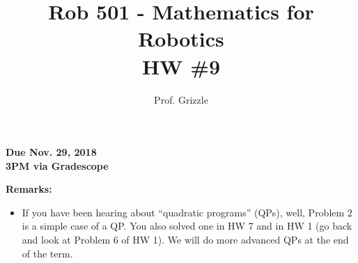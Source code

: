 \documentclass[letterpaper]{article}
\author{Prof. Grizzle}
\title{Rob 501 - Mathematics for Robotics\\
HW \#9}
\begin{document}
\date{}
\maketitle


 \newcommand{\trace}{\mathrm{trace}}
\newcommand{\real}{\mathbb R}  %
\newcommand{\nat}{\mathbb N}   %
\newcommand{\cp}{\mathbb C}    %
\newcommand{\ds}{\displaystyle}
\newcommand{\mf}[2]{\frac{\ds #1}{\ds #2}}
\newcommand{\Nagy}[2]{{Nagy, Page~#1, }{Prob.~#2}}
\newcommand{\spanof}[1]{\textrm{span} \{ #1 \}}
\parindent 0pt


\begin{flushright}
{\bfseries Due Nov. 29, 2018} \\
{\bfseries 3PM via Gradescope} \\[3mm]
\end{flushright}

\noindent \textbf{Remarks:}
 \begin{itemize}
 \item If you have been hearing about ``quadratic programs'' (QPs), well, Problem 2  is a simple case of a QP. You also solved one in HW 7 and in HW 1 (go back and look at Problem 6 of HW 1). We will do more advanced QPs at the end of the term.
     \end{itemize}
\end{document}
